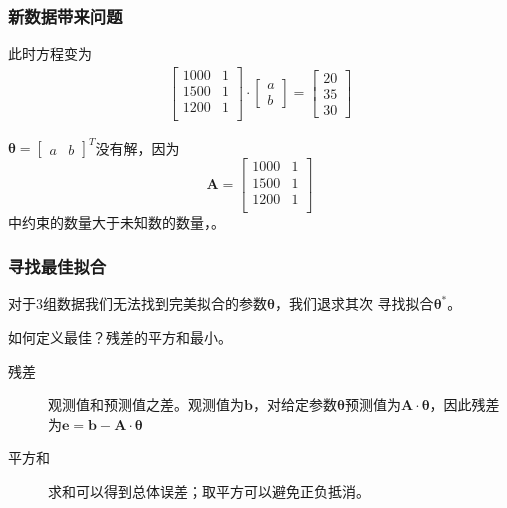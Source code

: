 \documentclass[14pt]{beamer}
\newcommand{\mat}[1]{\bm{#1}}
\renewcommand{\vec}[1]{\bm{#1}}
\let\emph\relax %
\begin{document}
\begin{frame}
    \frametitle{新数据带来问题}
    \label{fr:three_zones}
    此时方程变为
    \begin{align*}
        \begin{bmatrix}
            1000 & 1\\
            1500 & 1\\
            1200 & 1\\
        \end{bmatrix}\cdot
        \begin{bmatrix}
            a \\
            b
        \end{bmatrix}=
        \begin{bmatrix}
            20\\
            35\\
            30
        \end{bmatrix}
    \end{align*}

    $\vec{\theta}=
    \begin{bmatrix}
        a & b
    \end{bmatrix}^T$没有解，因为
    \[
        \mat{A}=    
        \begin{bmatrix}
            1000 & 1\\
            1500 & 1\\
            1200 & 1\\
        \end{bmatrix}
        \]
    中约束的数量大于未知数的数量，\emph{不可逆}。
    \end{frame}

    \begin{frame}
        \frametitle{寻找最佳拟合}
        对于3组数据我们无法找到完美拟合的参数$\vec{\theta}$，我们退求其次
        寻找\emph{最佳}拟合$\vec{\theta}^*$。
        
        如何定义最佳？残差的平方和最小。
        \begin{description}
            \item[残差] 观测值和预测值之差。观测值为$\vec{b}$，对给定参数$\vec{\theta}$预测值为$\mat{A}\cdot\vec{\theta}$，因此残差为$\vec{e}=\vec{b}-\mat{A}\cdot\vec{\theta}$ 
            \item[平方和] 求和可以得到总体误差；取平方可以避免正负抵消。 
        \end{description}
    \end{frame}
\end{document}
